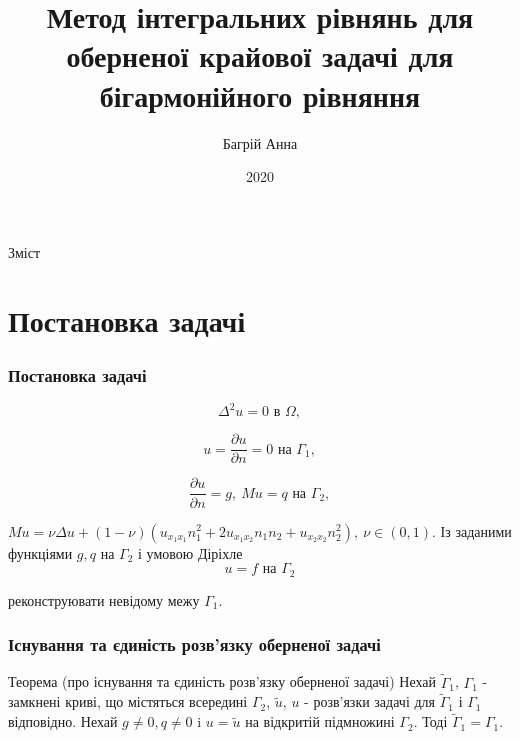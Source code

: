 \documentclass[10pt]{beamer}
\title[Метод ІР для оберненої крайової задачі]{Метод інтегральних рівнянь для оберненої крайової задачі для бігармонійного рівняння}
\author{Багрій Анна}
\institute[ЛНУ]{Львівський національний університет імені Івана Франка}
\date{2020}
\begin{document}
 
\frame{\titlepage}

\begin{frame}{Зміст}
\tableofcontents
\end{frame}

\section{Постановка задачі}
\begin{frame}
\frametitle{Постановка задачі}

\begin{equation}
	\label{mainSys}
	\Delta^2 u=0 \textrm{ в } \Omega,
\end{equation}

\begin{equation}
	\label{mainSys1}
	u=\frac{\partial u}{\partial n}=0 \textrm{ на } \Gamma_1, 
\end{equation}

\begin{equation}
	\label{mainSys2}
	\frac{\partial u}{\partial n}=g, \ M u=q \textrm{ на } \Gamma_2, 
\end{equation}

$Mu=\nu\Delta u+(1-\nu)(u_{x_1 x_1}n_1^2+2u_{x_1 x_2}n_1 n_2+u_{x_2 x_2}n_2^2), \ \nu\in (0, 1)$.
\newline
\newline
Із заданими функціями $g,q$ на $\Gamma_2$ і умовою Діріхле
\begin{equation}
\label{dataEq}
	u=f \textrm{ на } \Gamma_2
\end{equation}

реконструювати невідому межу $\Gamma_1$.

\end{frame}

\begin{frame}
\frametitle{Існування та єдиність розв'язку оберненої задачі}

\begin{block}{Теорема (про існування та єдиність розв'язку оберненої задачі)}
  Нехай $\tilde{\Gamma}_1$, $\Gamma_1$ - замкнені криві, що містяться всередині $\Gamma_2$, $\tilde{u}$, $u$ - розв'язки задачі  для $\tilde{\Gamma}_1$ і $\Gamma_1$ відповідно. Нехай $g\neq 0, q\neq 0$ i $u = \tilde{u}$ на відкритій підмножині $\Gamma_2$. Тоді $\tilde{\Gamma}_1=\Gamma_1$.
\end{block}

\end{frame}
\end{document}
